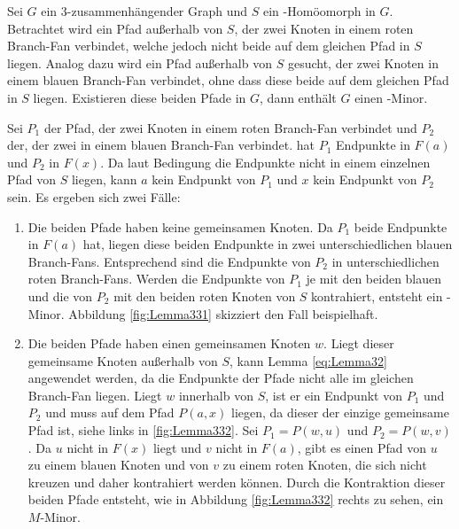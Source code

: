 \begin{lemma}\label{eq:Lemma33}
  Sei $G$ ein $3$-zusammenhängender Graph und $S$ ein \kdd-Homöomorph in $G$.
  Betrachtet wird ein Pfad außerhalb von $S$, der zwei Knoten in einem roten Branch-Fan verbindet, welche jedoch nicht beide auf dem gleichen Pfad in $S$ liegen.
  Analog dazu wird ein Pfad außerhalb von $S$ gesucht, der zwei Knoten in einem blauen Branch-Fan verbindet, ohne dass diese beide auf dem gleichen Pfad in $S$ liegen.
  Existieren diese beiden Pfade in $G$, dann enthält $G$ einen \kf-Minor.
\end{lemma}
\begin{beweis}
  Sei $P_1$ der Pfad, der zwei Knoten in einem roten Branch-Fan verbindet und $P_2$ der, der zwei in einem blauen Branch-Fan verbindet.
  \OBdA hat $P_1$ Endpunkte in $F(a)$ und $P_2$ in $F(x)$.
  Da laut Bedingung die Endpunkte nicht in einem einzelnen Pfad von $S$ liegen, kann $a$ kein Endpunkt von $P_1$ und $x$ kein Endpunkt von $P_2$ sein.
  Es ergeben sich zwei Fälle:
  \begin{enumerate}
    \item Die beiden Pfade haben keine gemeinsamen Knoten.
          Da $P_1$ beide Endpunkte in $F(a)$ hat, liegen diese beiden Endpunkte in zwei unterschiedlichen blauen Branch-Fans.
          Entsprechend sind die Endpunkte von $P_2$ in unterschiedlichen roten Branch-Fans.
          Werden die Endpunkte von $P_1$ je mit den beiden blauen und die von $P_2$ mit den beiden roten Knoten von $S$ kontrahiert, entsteht ein \kf-Minor.
          Abbildung \ref{fig:Lemma331} skizziert den Fall beispielhaft.
    \item Die beiden Pfade haben einen gemeinsamen Knoten $w$.
          Liegt dieser gemeinsame Knoten außerhalb von $S$, kann Lemma \ref{eq:Lemma32} angewendet werden, da die Endpunkte der Pfade nicht alle im gleichen Branch-Fan liegen.
          Liegt $w$ innerhalb von $S$, ist er ein Endpunkt von $P_1$ und $P_2$ und muss auf dem Pfad $P(a, x)$ liegen, da dieser der einzige gemeinsame Pfad ist, siehe links in \ref{fig:Lemma332}.
          Sei $P_1 = P(w, u)$ und $P_2 = P(w, v)$.
          Da $u$ nicht in $F(x)$ liegt und $v$ nicht in $F(a)$, gibt es einen Pfad von $u$ zu einem blauen Knoten und von $v$ zu einem roten Knoten, die sich nicht kreuzen und daher kontrahiert werden können.
          Durch die Kontraktion dieser beiden Pfade entsteht, wie in Abbildung \ref{fig:Lemma332} rechts zu sehen, ein $M$-Minor.
  \end{enumerate}
\end{beweis}
